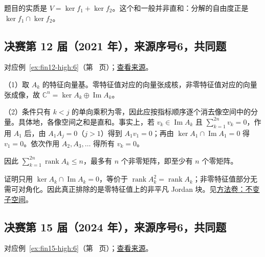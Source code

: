 \documentclass[UTF8,12pt,a4paper,fontset=fandol]{ctexart}
\begin{document}
\begin{remark}[方法与条件]

题目的实质是 $V=\ker f_1+\ker f_2$。这个和一般并非直和：分解的自由度正是 $\ker f_1\cap\ker f_2$。

\end{remark}

\subsection{决赛第 12 届（2021 年），来源序号6，共同题}\label{ans:fin12-high:6}\label{pr:fin12-high:6}

对应例~\ref{ex:fin12-high:6}（第~\pageref{ex:fin12-high:6} 页）；\href{https://github.com/lzxcr/cmc-mathematics/blob/64916fa1fdbc3e444a652eca204d5669058ee321/src/problems/finals/12/06.md}{查看来源}。

\begin{solve}

（1）取 $A_k$ 的特征向量基。零特征值对应的向量张成核，非零特征值对应的向量张成像，故 $\mathbb C^n=\ker A_k\oplus\operatorname{Im}A_k$。

（2）条件只有 $k<j$ 的单向乘积为零，因此应按指标顺序逐个消去像空间中的分量。具体地，各像空间之和是直和。事实上，若 $v_k\in\operatorname{Im}A_k$ 且 $\sum_{k=1}^{2n}v_k=0$，作用 $A_1$ 后，由 $A_1A_j=0$（$j>1$）得到 $A_1v_1=0$；再由 $\ker A_1\cap\operatorname{Im}A_1=0$ 得 $v_1=0$。依次作用 $A_2,A_3,\ldots$ 得所有 $v_k=0$。

因此 $\sum_{k=1}^{2n}\operatorname{rank}A_k\leq n$，最多有 $n$ 个非零矩阵，即至少有 $n$ 个零矩阵。

\end{solve}

\begin{remark}[方法与条件]

证明只用 $\ker A_k\cap\operatorname{Im}A_k=0$，等价于 $\operatorname{rank}A_k^2=\operatorname{rank}A_k$；非零特征值部分无需可对角化。因此真正排除的是零特征值上的非平凡 Jordan 块。见\hyperref[app:linear-invariant]{方法卷：不变子空间}。

\end{remark}

\subsection{决赛第 15 届（2024 年），来源序号6，共同题}\label{ans:fin15-high:6}\label{pr:fin15-high:6}

对应例~\ref{ex:fin15-high:6}（第~\pageref{ex:fin15-high:6} 页）；\href{https://github.com/lzxcr/cmc-mathematics/blob/64916fa1fdbc3e444a652eca204d5669058ee321/src/problems/finals/15/06.md}{查看来源}。
\end{document}
